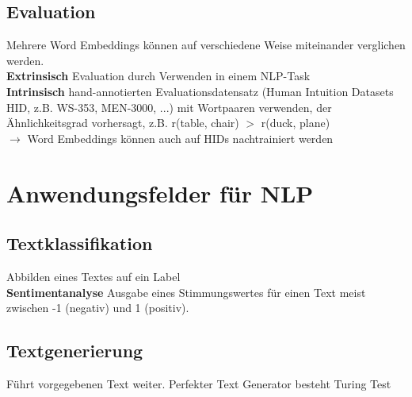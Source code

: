 \documentclass[12pt]{article}
\begin{document}
	\subsection{Evaluation}
	Mehrere Word Embeddings können auf verschiedene Weise miteinander verglichen werden.\\
	\textbf{Extrinsisch} Evaluation durch Verwenden in einem NLP-Task\\
	\textbf{Intrinsisch} hand-annotierten Evaluationsdatensatz (Human Intuition Datasets HID, z.B. WS-353, MEN-3000, ...) mit Wortpaaren verwenden, der Ähnlichkeitsgrad vorhersagt, z.B. r(table, chair) $>$ r(duck, plane)\\
	$\rightarrow$ Word Embeddings können auch auf HIDs nachtrainiert werden

	\section{Anwendungsfelder für NLP}
	\subsection{Textklassifikation}
	Abbilden eines Textes auf ein Label\\
	\textbf{Sentimentanalyse} Ausgabe eines Stimmungswertes für einen Text meist zwischen -1 (negativ) und 1 (positiv).

	\subsection{Textgenerierung}
	Führt vorgegebenen Text weiter. Perfekter Text Generator besteht Turing Test
	
\end{document}
